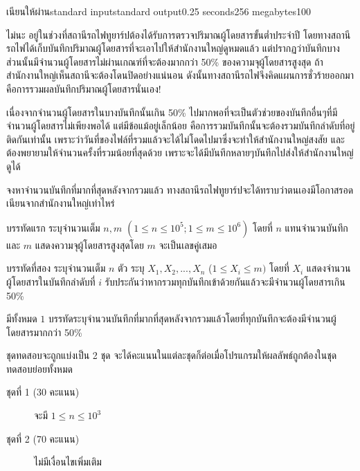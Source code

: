 \documentclass[11pt,a4paper]{article}
\begin{document}
\begin{problem}{เนียนให้ผ่าน}{standard input}{standard output}{0.25 seconds}{256 megabytes}{100}


ไม่นะ อยู่ในช่วงที่สถานีรถไฟทูยาร์ปต้องได้รับการตรวจปริมาณผู้โดยสารขั้นต่ำประจำปี โดยทางสถานีรถไฟได้เก็บบันทึกปริมาณผู้โดยสารที่จะเอาไปให้สำนักงานใหญ่ดูหมดแล้ว แต่ปรากฏว่าบันทึกบางส่วนนั้นมีจำนวนผู้โดยสารไม่ผ่านเกณฑ์ที่จะต้องมากกว่า 50\% ของความจุผู้โดยสารสูงสุด ถ้าสำนักงานใหญ่เห็นสถานีจะต้องโดนปิดอย่างแน่นอน ดังนั้นทางสถานีรถไฟจึงคิดแผนการชั่วร้ายออกมาคือการรวมผลบันทึกปริมาณผู้โดยสารนั่นเอง!

	เนื่องจากจำนวนผู้โดยสารในบางบันทึกนั้นเกิน 50\% ไปมากพอที่จะเป็นตัวช่วยของบันทึกอื่นๆที่มีจำนวนผู้โดยสารไม่เพียงพอได้ แต่มีข้อแม้อยู่เล็กน้อย คือการรวมบันทึกนั้นจะต้องรวมบันทึกลำดับที่อยู่ติดกันเท่านั้น เพราะว่าวันที่ของไฟล์ที่รวมแล้วจะได้ไม่โดดไปมาซึ่งจะทำให้สำนักงานใหญ่สงสัย และต้องพยายามให้จำนวนครั้งที่รวมน้อยที่สุดด้วย เพราะจะได้มีบันทึกหลายๆบันทึกไปส่งให้สำนักงานใหญ่ดูได้

	จงหาจำนวนบันทึกที่มากที่สุดหลังจากรวมแล้ว ทางสถานีรถไฟทูยาร์ปจะได้ทราบว่าตนเองมีโอกาสรอดเนียนจากสำนักงานใหญ่เท่าไหร่ 

\InputFile
บรรทัดแรก ระบุจำนวนเต็ม $ n,m$ $( 1\leq n\leq10^5 ; 1\leq m\leq10^6)$ โดยที่ $n$ แทนจำนวนบันทึกและ $m$ แสดงความจุผู้โดยสารสูงสุดโดย $m$ จะเป็นเลขคู่เสมอ

บรรทัดที่สอง ระบุจำนวนเต็ม $n$ ตัว ระบุ $X_1, X_2, ..., X_n$ ($1\leq X_i\leq m
)$ โดยที่  $X_i$ แสดงจำนวนผู้โดยสารในบันทึกลำดับที่ $i$ รับประกันว่าหากรวมทุกบันทึกเข้าด้วยกันแล้วจะมีจำนวนผู้โดยสารเกิน 50\% 

\OutputFile
มีทั้งหมด $1$ บรรทัดระบุจำนวนบันทึกที่มากที่สุดหลังจากรวมแล้วโดยที่ทุกบันทึกจะต้องมีจำนวนผู้โดยสารมากกว่า 50\%

\Scoring
ชุดทดสอบจะถูกแบ่งเป็น 2 ชุด จะได้คะแนนในแต่ละชุดก็ต่อเมื่อโปรแกรมให้ผลลัพธ์ถูกต้องในชุดทดสอบย่อยทั้งหมด

\begin{description}

\item[ชุดที่ 1 (30 คะแนน)] จะมี $ 1\leq n\leq10^3$

\item[ชุดที่ 2 (70 คะแนน)] ไม่มีเงื่อนไขเพิ่มเติม

\end{description}

\Examples

\begin{example}
%
%
\end{example}


\end{problem}
\end{document}
